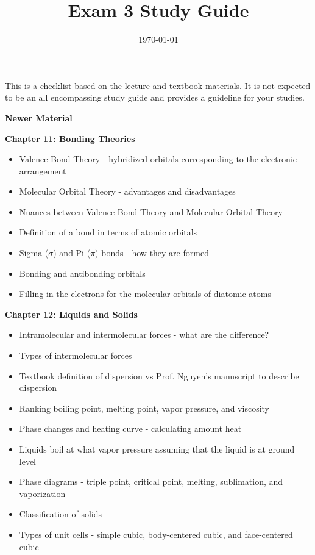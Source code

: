\documentclass[12pt]{article}
\title{\textbf{Exam 3 Study Guide}}
\date{\today}
\begin{document}
\maketitle 

This is a checklist based on the lecture and textbook materials. It is not
expected to be an all encompassing study guide and provides a guideline for
your studies.

\begin{Large}
  \textbf{Newer Material}
\end{Large}

\textbf{Chapter 11: Bonding Theories}

\begin{itemize}
\item Valence Bond Theory - hybridized orbitals corresponding to the
  electronic arrangement
\item Molecular Orbital Theory - advantages and disadvantages
\item Nuances between Valence Bond Theory and Molecular Orbital Theory
\item Definition of a bond in terms of atomic orbitals
\item Sigma ($\sigma$) and Pi ($\pi$) bonds - how they are formed
\item Bonding and antibonding orbitals
\item Filling in the electrons for the molecular orbitals of diatomic atoms
\end{itemize}

\textbf{Chapter 12: Liquids and Solids}

\begin{itemize}
\item Intramolecular and intermolecular forces - what are the difference?
\item Types of intermolecular forces
\item Textbook definition of dispersion vs Prof. Nguyen's manuscript to
  describe dispersion
\item Ranking boiling point, melting point, vapor pressure, and viscosity
\item Phase changes and heating curve - calculating amount heat
\item Liquids boil at what vapor pressure assuming that the liquid is at
  ground level
\item Phase diagrams - triple point, critical point, melting, sublimation,
  and vaporization
\item Classification of solids
\item Types of unit cells - simple cubic, body-centered cubic, and face-centered
  cubic
\end{itemize}
\end{document}
